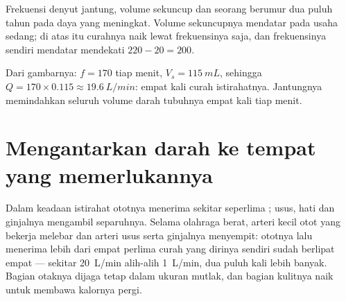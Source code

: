 \begin{omfigure}

{\small Frekuensi denyut jantung, volume sekuncup dan 
seorang berumur dua puluh tahun pada daya yang meningkat. Volume
sekuncupnya mendatar pada usaha sedang; di atas itu curahnya naik lewat
frekuensinya saja, dan frekuensinya sendiri mendatar mendekati $220 - 20 = 200$.}
\end{omfigure}

\begin{example}\label{ex:g10:heart-lungs-effort:output200}
Dari gambarnya: $f = 170$ tiap menit, $V_s = \qty{115}{mL}$, sehingga
$Q = 170 \times 0.115 \approx \qty{19.6}{L/min}$: empat kali curah
istirahatnya. Jantungnya memindahkan seluruh volume darah tubuhnya
empat kali tiap menit.
\end{example}

\section{Mengantarkan darah ke tempat yang memerlukannya}

\begin{proposition}\label{prop:g10:heart-lungs-effort:redistribution}
Dalam keadaan istirahat ototnya menerima sekitar seperlima ; usus, hati dan ginjalnya mengambil separuhnya. Selama olahraga
berat, arteri kecil otot yang bekerja melebar dan arteri usus serta
ginjalnya menyempit: ototnya lalu menerima lebih dari empat perlima
curah yang dirinya sendiri sudah berlipat empat --- sekitar
\qty{20}{L/min} alih-alih \qty{1}{L/min}, dua puluh kali lebih banyak.
Bagian otaknya dijaga tetap dalam ukuran mutlak, dan bagian kulitnya
naik untuk membawa kalornya pergi.
\end{proposition}
\admitted

